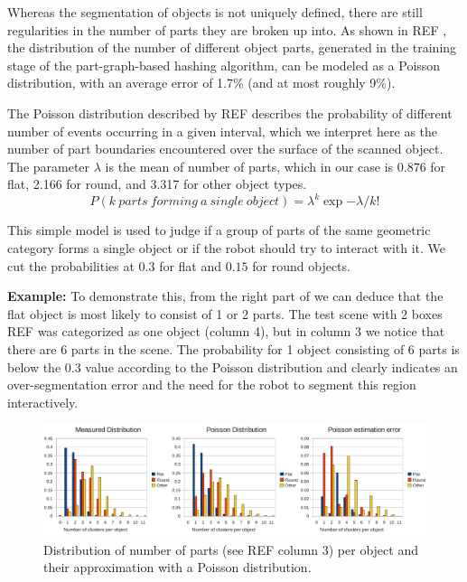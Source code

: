 Whereas the segmentation of objects is not uniquely defined, there are still regularities in the number of parts they are broken up into.
As shown in REF%
, the distribution of the number of different object parts, generated in the training stage of the part-graph-based hashing algorithm, can be modeled as a Poisson distribution,
with an average error of 1.7\% (and at most roughly 9\%).


The Poisson distribution described by REF%
describes the probability of different number of events occurring
in a given interval, which we interpret here as the number of part boundaries encountered over the surface of the scanned object.
The parameter $\lambda$ is the mean of number of parts, which in our case is 0.876 for flat, 2.166 for round, and 3.317 for other object types.
\begin{equation}
\label{eq:poisson}
P(k~parts~forming~a~single~object) = \lambda^k \exp{-\lambda} / k!
\end{equation}

This simple model is used to judge if a group of parts of the same geometric category forms a single object or if the robot
should try to interact with it. We cut the probabilities at $0.3$ for flat and $0.15$ for round objects.

\textbf{Example:} To demonstrate this, from the right part of %
we can deduce that the 
flat object is most likely to consist of 1 or 2 parts. The test scene with 
2 boxes REF %
was categorized as one object (column 4), but in column
3 we notice that there are 6 parts in the scene. The probability for 1 object consisting of 6 parts is below the $0.3$ value
according to the Poisson distribution and clearly indicates an over-segmentation 
error and the need for the robot to segment this region interactively.

\begin{figure}[h!]
\centering
  \includegraphics[width=0.98\columnwidth, trim=0ex 0ex 53ex 0ex, clip]{figures/dataset_stats.pdf}
	\vspace{-2ex}
  \caption{Distribution of number of parts (see REF column 3) per object and their approximation with a Poisson distribution.}
  \label{fig:poisson}
\end{figure}

